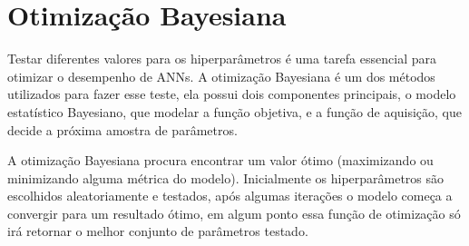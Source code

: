 
\section{Otimização Bayesiana}\label{cap_conceitos_bayesiana}
Testar diferentes valores para os hiperparâmetros é uma tarefa essencial para otimizar o desempenho de ANNs.
A otimização Bayesiana é um dos métodos utilizados para fazer esse teste, ela possui dois componentes principais,
o modelo estatístico Bayesiano, que modelar a função objetiva, e a função de aquisição, que decide a próxima amostra
de parâmetros. \cite{frazier2018tutorial}

A otimização Bayesiana procura encontrar um valor ótimo (maximizando ou minimizando alguma métrica do modelo).
Inicialmente os hiperparâmetros são escolhidos aleatoriamente e testados, após algumas iterações o modelo começa
a convergir para um resultado ótimo, em algum ponto essa função de otimização só irá retornar o melhor conjunto de
parâmetros testado.

